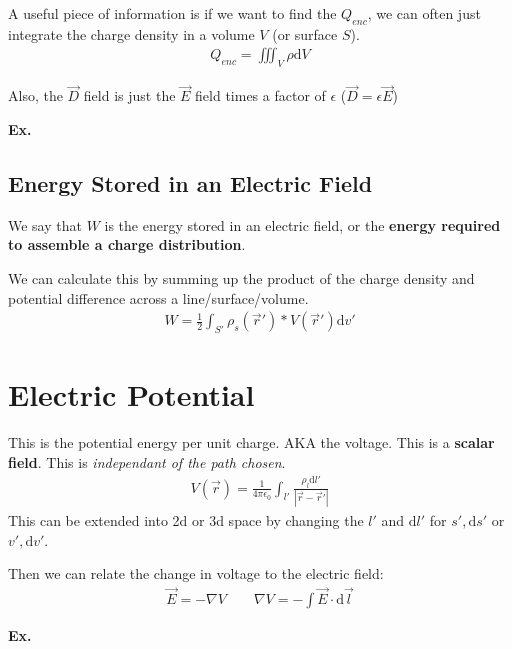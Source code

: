\documentclass[12pt,letterpaper]{article} \usepackage{amsmath} \usepackage{graphicx} \usepackage[margin=1in]{geometry} \usepackage{longtable}  \usepackage{amssymb}
\begin{document}
	A useful piece of information is if we want to find the $Q_{enc}$, we can often just integrate the charge density in a volume $V$ (or surface $S$).
	\begin{align*}
		Q_{enc} = \iiint_V \rho \mathrm d V
	\end{align*}

	Also, the $\vec D$ field is just the $\vec E$ field times a factor of $\epsilon$ ($\vec D = \epsilon \vec E$) 
	
	\begin{mdframed}
		\textbf{Ex. }
	\end{mdframed}
	
	\subsection{Energy Stored in an Electric Field}
	We say that $W$ is the energy stored in an electric field, or the \textbf{energy required to assemble a charge distribution}. 
	
	We can calculate this by summing up the product of the charge density and potential difference across a line/surface/volume.
	\begin{align*}
		W = \frac{1}{2}\int_{S\prime}\rho_s(\vec r\prime)*V(\vec r\prime) \mathrm d v\prime
	\end{align*}
	
	\section{Electric Potential}
	This is the potential energy per unit charge. AKA the voltage. This is a \textbf{scalar field}. This is \textit{independant of the path chosen}. 
	\begin{align*}
		V(\vec r) = \frac{1}{4\pi \epsilon _0} \int_{l\prime }\frac{\rho _l \mathrm d l\prime}{|\vec r-\vec r\prime| }
	\end{align*}
	This can be extended into 2d or 3d space by changing the $l\prime$ and $\mathrm d l\prime$ for $s\prime, \mathrm d s\prime$ or $v\prime, \mathrm d v\prime$.
	
	Then we can relate the change in voltage to the electric field:
	\begin{align*}
		\vec E = -\nabla V \qquad \nabla V = -\int \vec E\cdot \mathrm d \vec l
	\end{align*}
	
	\begin{mdframed}
		\textbf{Ex. }
	\end{mdframed}
\end{document}
